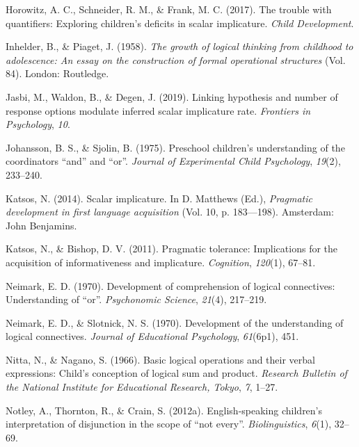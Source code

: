\documentclass[,man,floatsintext]{apa6}
\begin{document}
\leavevmode\hypertarget{ref-horowitz2017trouble}{}%
Horowitz, A. C., Schneider, R. M., \& Frank, M. C. (2017). The trouble with quantifiers: Exploring children's deficits in scalar implicature. \emph{Child Development}.

\leavevmode\hypertarget{ref-piaget1958growth}{}%
Inhelder, B., \& Piaget, J. (1958). \emph{The growth of logical thinking from childhood to adolescence: An essay on the construction of formal operational structures} (Vol. 84). London: Routledge.

\leavevmode\hypertarget{ref-jasbi2019linking}{}%
Jasbi, M., Waldon, B., \& Degen, J. (2019). Linking hypothesis and number of response options modulate inferred scalar implicature rate. \emph{Frontiers in Psychology}, \emph{10}.

\leavevmode\hypertarget{ref-johansson1975preschool}{}%
Johansson, B. S., \& Sjolin, B. (1975). Preschool children's understanding of the coordinators ``and'' and ``or''. \emph{Journal of Experimental Child Psychology}, \emph{19}(2), 233--240.

\leavevmode\hypertarget{ref-katsos2014scalar}{}%
Katsos, N. (2014). Scalar implicature. In D. Matthews (Ed.), \emph{Pragmatic development in first language acquisition} (Vol. 10, p. 183---198). Amsterdam: John Benjamins.

\leavevmode\hypertarget{ref-katsos2011pragmatic}{}%
Katsos, N., \& Bishop, D. V. (2011). Pragmatic tolerance: Implications for the acquisition of informativeness and implicature. \emph{Cognition}, \emph{120}(1), 67--81.

\leavevmode\hypertarget{ref-neimark1970}{}%
Neimark, E. D. (1970). Development of comprehension of logical connectives: Understanding of ``or''. \emph{Psychonomic Science}, \emph{21}(4), 217--219.

\leavevmode\hypertarget{ref-neimarkSlotnick1970}{}%
Neimark, E. D., \& Slotnick, N. S. (1970). Development of the understanding of logical connectives. \emph{Journal of Educational Psychology}, \emph{61}(6p1), 451.

\leavevmode\hypertarget{ref-nitta1966basic}{}%
Nitta, N., \& Nagano, S. (1966). Basic logical operations and their verbal expressions: Child's conception of logical sum and product. \emph{Research Bulletin of the National Institute for Educational Research, Tokyo}, \emph{7}, 1--27.

\leavevmode\hypertarget{ref-notley2012notevery}{}%
Notley, A., Thornton, R., \& Crain, S. (2012a). English-speaking children's interpretation of disjunction in the scope of ``not every''. \emph{Biolinguistics}, \emph{6}(1), 32--69.
\end{document}
